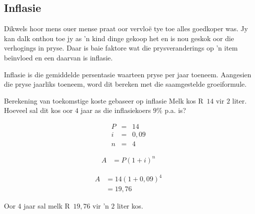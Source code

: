 \subsection{Inflasie}

Dikwels hoor mens ouer mense praat oor vervlo\"e tye toe alles goedkoper was. Jy kan dalk onthou toe jy as 'n kind dinge gekoop het en is nou geskok oor die verhogings in pryse. Daar is baie faktore wat die prysveranderings op 'n item be\"invloed en een daarvan is inflasie.\par

Inflasie is die gemiddelde persentasie waarteen pryse per jaar toeneem. Aangesien die pryse jaarliks toeneem, word dit bereken met die saamgestelde groeiformule.\par



\pagebreak
\begin{wex}{Berekening van toekomstige koste gebaseer op inflasie}
    {Melk kos R~$14$ vir $2$ liter. Hoeveel sal dit kos oor $4$ jaar as die inflasiekoers $9\%$ p.a. is?}{
    
    \begin{eqnarray*}
	P &=& 14\\
	i &=& 0,09\\
	n &=& 4
    \end{eqnarray*}

    \begin{align*}
	A &= P(1 + i)^n
    \end{align*}

    \begin{align*}
	A &= 14(1 + 0,09)^4\\
	  &= 19,76
    \end{align*}

    Oor $4$ jaar sal melk R~$19,76$ vir 'n $2$ liter kos.
    }
\end{wex}


